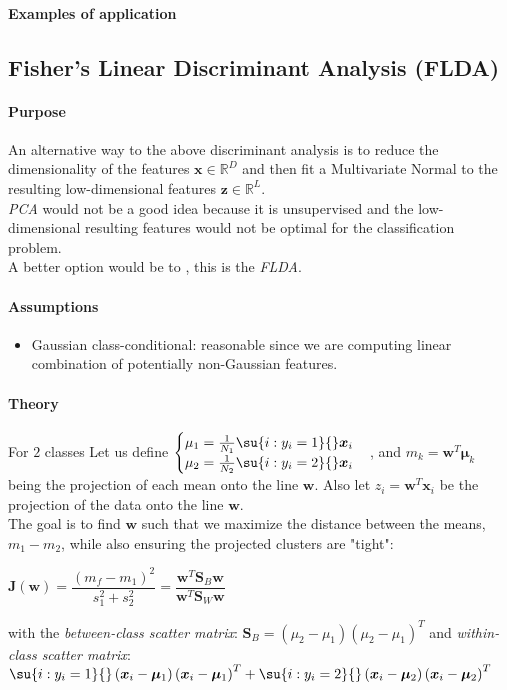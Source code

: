 \paragraph{Examples of application}

\subsection{Fisher's Linear Discriminant Analysis (FLDA)}
\paragraph{Purpose}
An alternative way to the above discriminant analysis is to reduce the dimensionality
of the features $\bm{x}\in\mathbb{R}^{D}$ and then fit a Multivariate Normal to the 
resulting low-dimensional features $\bm{z}\in \mathbb{R}^{L}$.\\
\emph{PCA} would not be a good idea because it is unsupervised and the low-dimensional
resulting features would not be optimal for the classification problem.\\
A better option would be to , this is the \emph{FLDA}.
\paragraph{Assumptions}
\begin{itemize}
    \item Gaussian class-conditional: reasonable since we are computing linear 
        combination of potentially non-Gaussian features.
\end{itemize}

\paragraph{Theory}
For $2$ classes
Let us define 
$\begin{cases}
    \mu_{1} = \frac{1}{N_{1}}\su{i:y_{i}=1}{}\bm{x}_{i}\\
    \mu_{2} = \frac{1}{N_{2}}\su{i:y_{i}=2}{}\bm{x}_{i}
\end{cases}$,
and $m_{k} = \bm{w}^{T}\bm{\mu}_{k}$ being the projection of each mean onto the line
$\bm{w}$. Also let $z_{i}=\bm{w}^{T}\bm{x}_{i}$ be the projection of the data onto the 
line $\bm{w}$.\\
The goal is to find $\bm{w}$ such that we maximize the distance between the means,
$m_{1} - m_{2}$, while also ensuring the projected clusters are "tight":
\begin{center}
    $\bm{J}(\bm{w}) = \dfrac{(m_{f} - m_{1})^{2}}{s_{1}^{2} + s_{2}^{2}}
    = \dfrac{\bm{w}^{T}\bm{S}_{B}\bm{w}}{\bm{w}^{T}\bm{S}_{W}\bm{w}}$
\end{center}
with the \emph{between-class scatter matrix}: $\bm{S}_{B} = \left(\mu_{2} - \mu_{1}
\right)\left(\mu_{2} - \mu_{1}\right)^{T}$ and \emph{within-class scatter matrix}:
$
\su{i:y_{i}=1}{}\left(\bm{x}_{i} - \bm{\mu}_{1}\right) \left(\bm{x}_{i} - 
\bm{\mu}_{1}\right)^{T} + \su{i:y_{i}=2}{}\left(\bm{x}_{i} - \bm{\mu}_{2}\right)\left(
\bm{x}_{i} - \bm{\mu}_{2}\right)^{T}
$


